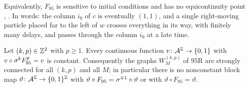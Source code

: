 Equivalently, $F_{95}$ is sensitive to initial conditions and has no equicontinuity point \cite[Theorem~3 and Corollary~2]{Kurka1997}, \cite[Proposition~2.1]{BT2000}. In words: the column $i_0$ of $c$ is eventually $(1,1)$, and a single right-moving particle placed far to the left of $w$ crosses everything in its way, with finitely many delays, and passes through the column $i_0$ at a late time.

\begin{proposition}\label{cl:prop:95eigen}
Let $(k,p)\in\mathbb{Z}^2$ with $p\ge1$. Every continuous function $v\colon\mathcal{A}^{\mathbb{Z}}\to\{0,1\}$ with $v\circ\sigma^kF_{95}^p=v$ is constant. Consequently the graphs $W^{(k,p)}_M$ of $95$R are strongly connected for all $(k,p)$ and all $M$; in particular there is no nonconstant block map $\vartheta\colon\mathcal{A}^{\mathbb{Z}}\to\{0,1\}^{\mathbb{Z}}$ with $\vartheta\circ F_{95}=\sigma^{\mp1}\circ\vartheta$ or with $\vartheta\circ F_{95}=\vartheta$.
\end{proposition}

